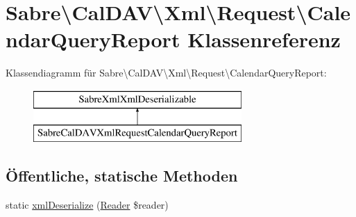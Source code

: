 \hypertarget{class_sabre_1_1_cal_d_a_v_1_1_xml_1_1_request_1_1_calendar_query_report}{}\section{Sabre\textbackslash{}Cal\+D\+AV\textbackslash{}Xml\textbackslash{}Request\textbackslash{}Calendar\+Query\+Report Klassenreferenz}
\label{class_sabre_1_1_cal_d_a_v_1_1_xml_1_1_request_1_1_calendar_query_report}
Klassendiagramm für Sabre\textbackslash{}Cal\+D\+AV\textbackslash{}Xml\textbackslash{}Request\textbackslash{}Calendar\+Query\+Report\+:\begin{figure}[H]
\begin{center}
\leavevmode
\includegraphics[height=2.000000cm]{class_sabre_1_1_cal_d_a_v_1_1_xml_1_1_request_1_1_calendar_query_report}
\end{center}
\end{figure}
\subsection*{Öffentliche, statische Methoden}
\begin{DoxyCompactItemize}
\item 
static \mbox{\hyperlink{class_sabre_1_1_cal_d_a_v_1_1_xml_1_1_request_1_1_calendar_query_report_a4302daa8f9bd88cecaa13fcfa3767013}{xml\+Deserialize}} (\mbox{\hyperlink{class_sabre_1_1_xml_1_1_reader}{Reader}} \$reader)
\end{DoxyCompactItemize}
